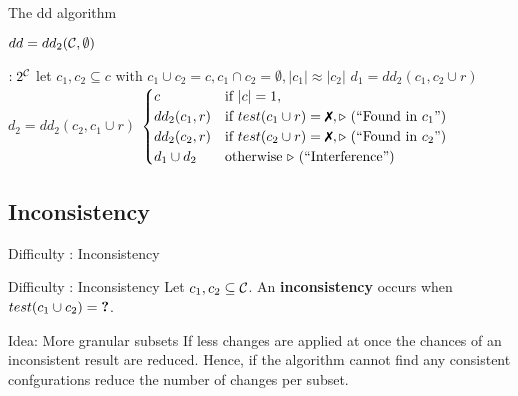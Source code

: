 \begin{frame}{The dd algorithm}


	$dd = dd_2(\mathcal{C}, \emptyset)$ \\[1.5em]

	\begin{algorithmic}[1]
		 $: 2^{\mathcal{C}}$
		\State let $c_1,c_2 \subseteq c \text{ with } c_1 \cup c_2 = c, c_1 \cap c_2 = \emptyset, |c_1| \approx |c_2|$
		\State $d_1 = dd_2(c_1, c_2 \cup r)$ %
		\State $d_2 = dd_2(c_2, c_1 \cup r)$ \medskip %
		\State \Return $ \begin{cases}
				c & \text{if } |c|=1, \\
				dd_2(c_1,r) & \text{if } test(c_1 \cup r) = \xmark, \text{\Comment(``Found in $c_1$'')}\\
				dd_2(c_2,r) & \text{if } test(c_2 \cup r) = \xmark, \text{\Comment(``Found in $c_2$'')}\\
				d_1 \cup d_2 & \text{otherwise } \text{\Comment(``Interference'')}
			\end{cases}$
		\EndFunction
	\end{algorithmic}

\end{frame}

\subsection{Inconsistency}
\begin{frame}{Difficulty : Inconsistency}

	\begin{alertblock}{Difficulty : Inconsistency}
		Let $c_1,c_2 \subseteq \mathcal{C}$. An \textbf{inconsistency} occurs when $test(c_1 \cup c_2) = \textbf{?}$.
	\end{alertblock}
	\bigskip

	\pause
	\begin{exampleblock}{Idea: More granular subsets}
		If less changes are applied at once the chances of an inconsistent result are reduced. Hence, if the algorithm cannot find any consistent confgurations reduce the number of changes per subset.
	\end{exampleblock}

\end{frame}


